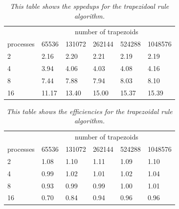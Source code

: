 \documentclass[a4paper,11pt,twoside]{article}
\begin{document}
\begin{table}[]
\centering
\caption{\textit{This table shows the sppedups for the trapezidoal rule algorithm.}}
\label{tab:speedup_trap}
\begin{tabular}{llllll}
\multicolumn{1}{l|}{}          & \multicolumn{5}{c}{number of trapezoids}                                                                                       \\ \cline{2-6} 
\multicolumn{1}{l|}{processes} & \multicolumn{1}{l|}{65536} & \multicolumn{1}{l|}{131072} & \multicolumn{1}{l|}{262144} & \multicolumn{1}{l|}{524288} & 1048576 \\ \hline
2                              & 2.16                       & 2.20                        & 2.21                        & 2.19                        & 2.19    \\
4                              & 3.94                       & 4.06                        & 4.03                        & 4.08                        & 4.16    \\
8                              & 7.44                       & 7.88                        & 7.94                        & 8.03                        & 8.10    \\
16                             & 11.17                      & 13.40                       & 15.00                       & 15.37                       & 15.39  
\end{tabular}
\end{table}

\begin{table}[]
\centering
\caption{\textit{This table shows the efficiencies for the trapezoidal rule algorithm.}}
\label{tab:efficiencies_trap}
\begin{tabular}{llllll}
\multicolumn{1}{l|}{}          & \multicolumn{5}{c}{number of trapezoids}                                                                                       \\ \cline{2-6} 
\multicolumn{1}{l|}{processes} & \multicolumn{1}{l|}{65536} & \multicolumn{1}{l|}{131072} & \multicolumn{1}{l|}{262144} & \multicolumn{1}{l|}{524288} & 1048576 \\ \hline
2                              & 1.08                       & 1.10                        & 1.11                        & 1.09                        & 1.10    \\
4                              & 0.99                       & 1.02                        & 1.01                        & 1.02                        & 1.04    \\
8                              & 0.93                       & 0.99                        & 0.99                        & 1.00                        & 1.01    \\
16                             & 0.70                       & 0.84                        & 0.94                        & 0.96                        & 0.96   
\end{tabular}
\end{table}
\end{document}
